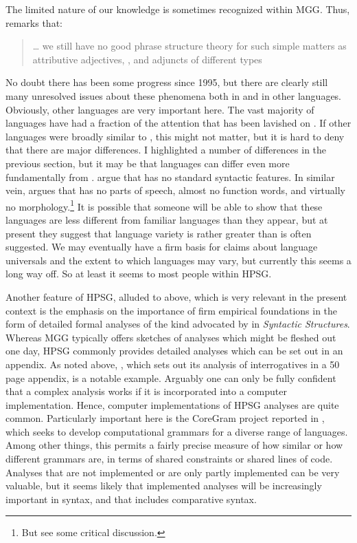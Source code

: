 \documentclass[output=paper]{langsci/langscibook}
\begin{document}
The limited nature of our knowledge is sometimes recognized within \gls{MGG}.
Thus, \textcite[382, fn.\ 22]{Chomsky1995} remarks that: \blockquote{\dots{}
we still have no good phrase structure theory for such simple matters as
attributive adjectives, , and adjuncts of different types}.  No
doubt there has been some progress since 1995, but there are clearly still many
unresolved issues about these phenomena both in  and in other
languages. Obviously, other languages are very important here.  The vast
majority of languages have had a fraction of the attention that has been
lavished on . If other languages were broadly similar to , this
might not matter, but it is hard to deny that there are major differences. I
highlighted a number of differences in the previous section, but it may be that
languages can differ even more fundamentally from .
\citet{KoeMich2014} argue that  has no standard syntactic
features. In similar vein, \textcite{Gil2005,Gil2009} argues that  has no parts of speech, almost no function words, and virtually no
morphology.\footnote{But see \citet{Yoder2010} some critical discussion.} It is
possible that someone will be able to show that these languages are less
different from familiar languages than they appear, but at present they suggest
that language variety is rather greater than is often suggested. We may
eventually have a firm basis for claims about language universals and the
extent to which languages may vary, but currently this seems a long way off. So
at least it seems to most people within \gls{HPSG}.\largerpage

Another feature of \gls{HPSG}, alluded to above, which is very relevant in the
present context is the emphasis on the importance of firm empirical foundations
in the form of detailed formal analyses of the kind advocated by
\citeauthor{Chomsky1957} in \emph{Syntactic Structures}. Whereas \gls{MGG}
typically offers sketches of analyses which might be fleshed out one day,
\gls{HPSG} commonly provides detailed analyses which can be set out in an
appendix. As noted above, \citet{GinSag2000}, which sets out its analysis of
 interrogatives in a 50 page appendix, is a notable example.
Arguably one can only be fully confident that a complex analysis works if it is
incorporated into a computer implementation. Hence, computer implementations of
\gls{HPSG} analyses are quite common. Particularly important here is the
CoreGram project reported in \citet{Muller2015}, which seeks to develop
computational grammars for a diverse range of languages. Among other things,
this permits a fairly precise measure of how similar or how different grammars
are, in terms of shared constraints or shared lines of code. Analyses that are
not implemented or are only partly implemented can be very valuable, but it
seems likely that implemented analyses will be increasingly important in
syntax, and that includes comparative syntax.
\end{document}
